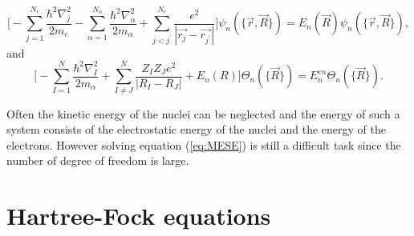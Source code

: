 \documentclass[twoside,english]{uiofysmaster}
\begin{document}
\begin{equation}\label{eq:MESE}
\Bigg[-\sum_{j=1}^{N_e} \frac{\hbar^2\nabla_j^2}{2m_e} -\sum_{\alpha=1}^{N_n} \frac{\hbar^2\nabla_{\alpha}^2}{2m_\alpha} +\sum_{j<j^{\prime}}^{N_e} \frac{e^2}{|\vec{r_j} - \vec{r_{j^{\prime}}}|} \Bigg] \psi_n(\{\vec{r}, \vec{R}\}) = E_n(\vec{R}) \psi_n(\{\vec{r}, \vec{R}\}), 
\end{equation}
and 
\begin{equation}
\Bigg[-\sum_{I=1}^{N} \frac{\hbar^2\nabla_I^2}{2m_\alpha} + \sum_{I\neq J}^{N} \frac{Z_IZ_Je^2}{|R_I-R_J|} + E_n(R)\Bigg]\Theta_n(\{\vec{R}\})=E_n^{en}\Theta_n(\{\vec{R}\}).
\end{equation}

Often the kinetic energy of the nuclei can be neglected and the energy of such a system consists of the electrostatic energy of the nuclei and the energy of the electrons.
However solving equation (\ref{eq:MESE}) is still a difficult task since the number of degree of freedom is large. 





\section{Hartree-Fock equations} 
\end{document}
